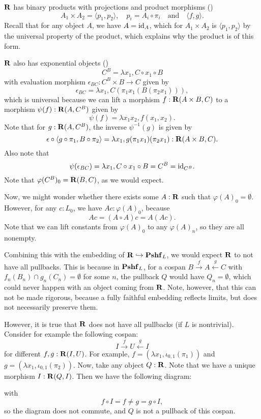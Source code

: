 $ \mathbf{R} $ has binary products with projections and product morphisms ()
\[ A_1 \times A_2 = \langle p_1, p_2 \rangle, \quad p_i = A_i \circ \pi_i \quad \text{and} \quad \langle f, g \rangle. \]
Recall that for any object $ A $, we have $ A = \text{id}_{A} $, which for $ A_1 \times A_2 $ is $ \langle p_1, p_2 \rangle $ by the universal property of the product, which explains why the product is of this form.

$ \mathbf{R} $ also has exponential objects ()
\[ C^B = \lambda x_1, C \circ x_1 \circ B \]
with evaluation morphism $ \epsilon_{BC}: C^B \times B \to C $ given by
\[ \epsilon_{BC} = \lambda x_1, C(\pi_1 x_1 (B (\pi_2 x_1))), \]
which is universal because we can lift a morphism $ f: \mathbf{R}(A \times B, C) $ to a morphism $ \psi(f): \mathbf{R}(A, C^B) $ given by
\[ \psi(f) = \lambda x_1 x_2, f (x_1, x_2). \]
Note that for $ g: \mathbf{R}(A, C^B) $, the inverse $ \psi^{-1}(g) $ is given by
\[ \epsilon \circ \langle g \circ \pi_1, B \circ \pi_2 \rangle = \lambda x_1, g (\pi_1 x_1) (\pi_2 x_1): \mathbf{R}(A \times B, C). \]
Also note that
\[ \psi(\epsilon_{BC}) = \lambda x_1, C \circ x_1 \circ B = C^B = \text{id}_{C^B}. \]
Note that $ \varphi(C^B)_0 = \mathbf{R}(B, C) $, as we would expect.

Now, we might wonder whether there exists some $ A: \mathbf{R} $ such that $ \varphi(A)_0 = \emptyset $. However, for any $ c : L_0 $, we have $ A c : \varphi(A)_0 $, because
\[ A c = (A \circ A) c = A (A c). \]
Note that we can lift constants from $ \varphi(A)_0 $ to any $ \varphi(A)_n $, so they are all nonempty.

Combining this with the embedding of $ \mathbf{R} \hookrightarrow \mathbf{Pshf}_{L} $, we would expect $ \mathbf{R} $ to not have all pullbacks. This is because in $ \mathbf{Pshf}_{L} $, for a cospan $ B \xrightarrow f A \xleftarrow g C $ with $ f_n(B_n) \cap g_n(C_n) = \emptyset $ for some $ n $, the pullback $ Q $ would have $ Q_n = \emptyset $, which could never happen with an object coming from $ \mathbf{R} $. Note, however, that this can not be made rigorous, because a fully faithful embedding reflects limits, but does not necessarily preserve them.

However, it is true that $ \mathbf{R} $ does not have all pullbacks (if $ L $ is nontrivial). Consider for example the following cospan:
\[ I \xrightarrow f U \xleftarrow g I \]
for different $ f, g: \mathbf{R}(I, U) $. For example, $ f = (\lambda x_1, \iota_{0, 1}(\pi_1)) $ and $ g = (\lambda x_1, \iota_{0, 1}(\pi_2)) $. Now, take any object $ Q: \mathbf{R} $. Note that we have a unique morphism $ I: \mathbf{R}(Q, I) $. Then we have the following diagram:
\begin{center}
\end{center}
with
\[ f \circ I = f \not = g = g \circ I, \]
so the diagram does not commute, and $ Q $ is not a pullback of this cospan.

